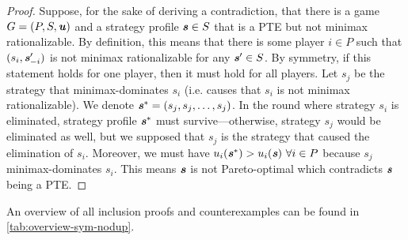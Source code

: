 \begin{proof}
	Suppose, for the sake of deriving a contradiction, that there is a game $G = (P, S, \boldsymbol{\mathit{u}})$ and a strategy profile $\boldsymbol{\mathit{s}} \in S$ that is a PTE but not minimax rationalizable.
	By definition, this means that there is some player $i \in P$ such that $(s_i, \boldsymbol{\mathit{s}}_{-i}')$ is not minimax rationalizable for any $\boldsymbol{\mathit{s}}' \in S$.
	By symmetry, if this statement holds for one player, then it must hold for all players.
	Let $s_j$ be the strategy that minimax-dominates $s_i$ (i.e. causes that $s_i$ is not minimax rationalizable).
	We denote $\boldsymbol{\mathit{s}}^* = (s_j, s_j, \dots, s_j)$.
	In the round where strategy $s_i$ is eliminated, strategy profile $\boldsymbol{\mathit{s}}^*$ must survive---otherwise, strategy $s_j$ would be eliminated as well, but we supposed that $s_j$ is the strategy that caused the elimination of $s_i$.
	Moreover, we must have $u_i(\boldsymbol{\mathit{s}}^*) > u_i(\boldsymbol{\mathit{s}})\ \forall i \in P$ because $s_j$ minimax-dominates $s_i$.
	This means $\boldsymbol{\mathit{s}}$ is not Pareto-optimal which contradicts $\boldsymbol{\mathit{s}}$ being a PTE.
\end{proof}

An overview of all inclusion proofs and counterexamples can be found in \autoref{tab:overview-sym-nodup}.
